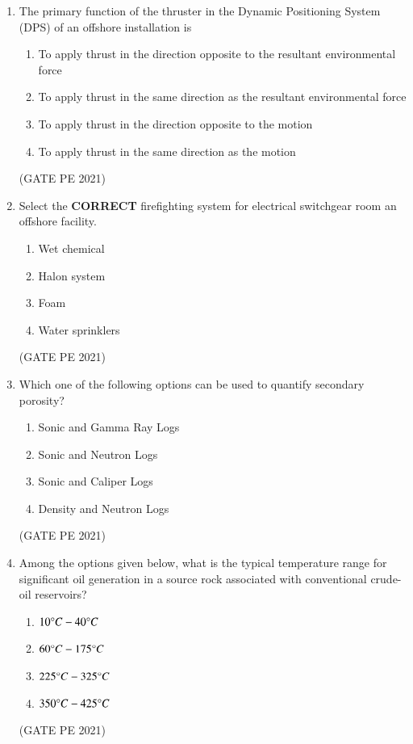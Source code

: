 \documentclass[journal,12pt,onecolumn]{IEEEtran}
\theoremstyle{remark}
\begin{document}
\begin{enumerate}
\item The primary function of the thruster in the Dynamic Positioning System (DPS) of an offshore installation is
\begin{enumerate}
    \item To apply thrust in the direction opposite to the resultant environmental force
    \item To apply thrust in the same direction as the resultant environmental force
    \item To apply thrust in the direction opposite to the motion
    \item To apply thrust in the same direction as the motion
\end{enumerate}
\hfill{(GATE PE 2021)}

\item Select the \textbf{CORRECT} firefighting system for electrical switchgear room an offshore facility.
\begin{enumerate}
    \item Wet chemical
    \item Halon system
    \item Foam
    \item Water sprinklers
\end{enumerate}
\hfill{(GATE PE 2021)}

\item Which one of the following options can be used to quantify secondary porosity?
\begin{enumerate}
    \item Sonic and Gamma Ray Logs
    \item Sonic and Neutron Logs
    \item Sonic and Caliper Logs
    \item Density and Neutron Logs
\end{enumerate}
\hfill{(GATE PE 2021)}

\item Among the options given below, what is the typical temperature range for significant oil generation in a source rock associated with conventional crude-oil reservoirs?
\begin{enumerate}
    \item $10\degree C-40\degree C$
    \item $60\degree C-175\degree C$
    \item $225\degree C-325\degree C$
    \item $350\degree C-425\degree C$
\end{enumerate}
\hfill{(GATE PE 2021)}


\end{enumerate}
\end{document}
